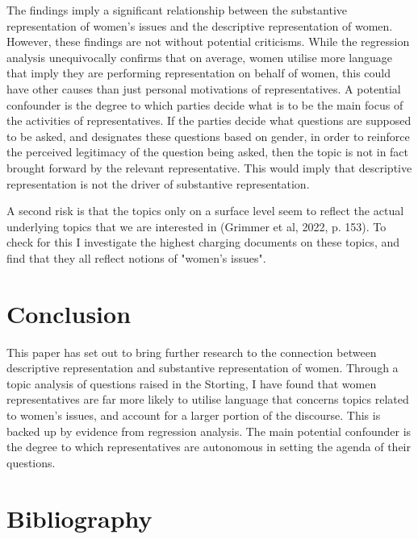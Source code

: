 \documentclass[12pt]{article}
\begin{document}
	The findings imply a significant relationship between the substantive representation of women's issues and the descriptive representation of women. However, these findings are not without potential criticisms. While the regression analysis unequivocally confirms that on average, women utilise more language that imply they are performing representation on behalf of women, this could have other causes than just personal motivations of representatives. A potential confounder is the degree to which parties decide what is to be the main focus of the activities of representatives. If the parties decide what questions are supposed to be asked, and designates these questions based on gender, in order to reinforce the perceived legitimacy of the question being asked, then the topic is not in fact brought forward by the relevant representative. This would imply that descriptive representation is not the driver of substantive representation. 
	
	A second risk is that the topics only on a surface level seem to reflect the actual underlying topics that we are interested in (Grimmer et al, 2022, p. 153). To check for this I investigate the highest charging documents on these topics, and find that they all reflect notions of "women's issues". 
	
	\section{Conclusion}
	
	This paper has set out to bring further research to the connection between descriptive representation and substantive representation of women. Through a topic analysis of questions raised in the Storting, I have found that women representatives are far more likely to utilise language that concerns topics related to women's issues, and account for a larger portion of the discourse. This is backed up by evidence from regression analysis. The main potential confounder is the degree to which representatives are autonomous in setting the agenda of their questions.
	
	\section{Bibliography}
	
\end{document}
